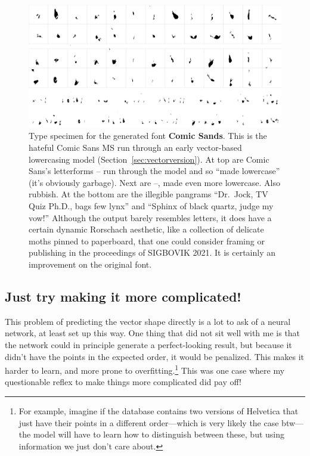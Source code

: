 \documentclass[twocolumn]{article}
\begin{document}
\begin{figure}[tp]
\centering
  \includegraphics[width=0.95 \linewidth]{comicsands}
\caption{
  Type specimen for the generated font {\bf Comic Sands}. This is
  the hateful Comic Sans MS run through an early vector-based lowercasing
  model (Section~\ref{sec:vectorversion}). At top are Comic Sans's letterforms
  -- run through the model and so ``made
  lowercase'' (it's obviously garbage). Next are
  --,
  made even more lowercase. Also rubbish.
  At the bottom are the illegible pangrams
  ``Dr.~Jock, TV Quiz Ph.D., bags few lynx''
  and ``Sphinx of black quartz, judge my vow!'' Although the output
  barely resembles letters, it does have a certain dynamic
  Rorschach aesthetic, like a collection of delicate moths pinned
  to paperboard, that one could consider framing or publishing in
  the proceedings of SIGBOVIK 2021. It is certainly an improvement on
  the original font.
} \label{fig:comicsands}
\end{figure}


\subsection{Just try making it more complicated!} \label{sec:complicated}

This problem of predicting the vector shape directly is a lot to ask
of a neural network, at least set up this way. One thing that did not
sit well with me is that the network could in principle generate a
perfect-looking result, but because it didn't have the points in the
expected order, it would be penalized. This makes it harder to learn,
and more prone to overfitting.\footnote{For example, imagine if the database
contains two versions of Helvetica that just have their points in a
different order---which is very likely the case btw---the model will
have to learn how to distinguish between these, but using information
we just don't care about.} This was one case where my questionable
reflex to make things more complicated did pay off!
\end{document}
